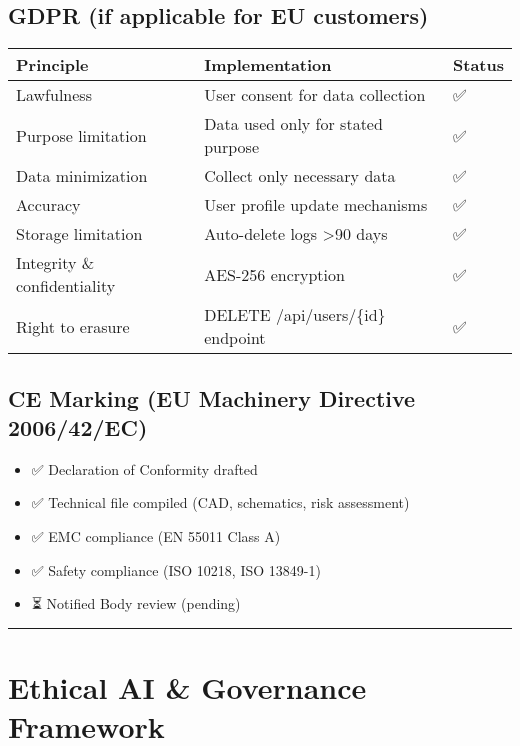 \documentclass[
]{article}
\providecommand{\tightlist}{%
  \setlength{\itemsep}{0pt}\setlength{\parskip}{0pt}}
\begin{document}
\hypertarget{gdpr-if-applicable-for-eu-customers}{%
\subsection{GDPR (if applicable for EU
customers)}\label{gdpr-if-applicable-for-eu-customers}}

\begin{longtable}[]{@{}lll@{}}
\toprule\noalign{}
Principle & Implementation & Status \\
\midrule\noalign{}
\endhead
\bottomrule\noalign{}
\endlastfoot
Lawfulness & User consent for data collection & ✅ \\
Purpose limitation & Data used only for stated purpose & ✅ \\
Data minimization & Collect only necessary data & ✅ \\
Accuracy & User profile update mechanisms & ✅ \\
Storage limitation & Auto-delete logs \textgreater90 days & ✅ \\
Integrity \& confidentiality & AES-256 encryption & ✅ \\
Right to erasure & DELETE /api/users/\{id\} endpoint & ✅ \\
\end{longtable}

\hypertarget{ce-marking-eu-machinery-directive-200642ec}{%
\subsection{CE Marking (EU Machinery Directive
2006/42/EC)}\label{ce-marking-eu-machinery-directive-200642ec}}

\begin{itemize}
\tightlist
\item
  ✅ Declaration of Conformity drafted
\item
  ✅ Technical file compiled (CAD, schematics, risk assessment)
\item
  ✅ EMC compliance (EN 55011 Class A)
\item
  ✅ Safety compliance (ISO 10218, ISO 13849-1)
\item
  ⏳ Notified Body review (pending)
\end{itemize}

\begin{center}\rule{0.5\linewidth}{0.5pt}\end{center}

\hypertarget{ethical-ai-governance-framework}{%
\section{Ethical AI \& Governance
Framework}\label{ethical-ai-governance-framework}}
\end{document}
